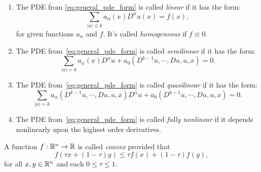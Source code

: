 \begin{definitions}\leavevmode
  \begin{enumerate}
    \item The PDE from \cref{eq:general_pde_form} is called \emph{linear} if it has the form:
      \[%
        \sum_{|\alpha|\le k} a_\alpha(x) D^\alpha u(x) = f(x)
      ,\]%
      for given functions $a_\alpha$ and $f$. It's called \emph{homogeneous} if $f \equiv 0$.
    \item The PDE from~\cref{eq:general_pde_form} is called \emph{semilinear} if it has the form:
      \[%
        \sum_{|\alpha|=k} a_\alpha(x) D^\alpha u + a_0(D^{k-1}u, \cdots, Du, u, x) = 0
      .\]%
    \item The PDE from~\cref{eq:general_pde_form} is called \emph{quasilinear} if it has the form:
      \[%
        \sum_{|\alpha|=k} a_\alpha(D^{k-1}u, \cdots, Du, u, x)D^\alpha u + a_0(D^{k-1}u, \cdots, Du, u, x) = 0
      .\]%
    \item The PDE from~\cref{eq:general_pde_form} is called \emph{fully nonlinear} if it depends nonlinearly upon the highest order derivatives.
  \end{enumerate}
\end{definitions}

\begin{definition}[Convex]
  A function $f : \mathbb{R}^n \rightarrow \mathbb{R}$ is called \emph{convex} provided that
  \[%
    f(\tau x + (1 - \tau)y) \le \tau f(x) + (1 - \tau)f(y)
  ,\]%
  for all $x, y \in \mathbb{R}^n$ and each $0 \le \tau \le 1$.
\end{definition}

